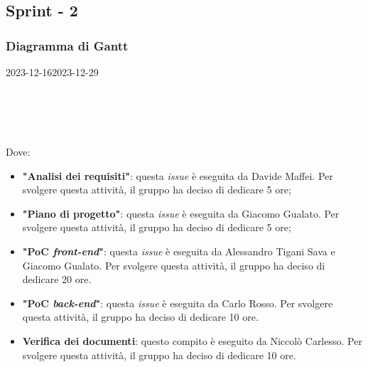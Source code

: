 \subsection{Sprint - 2}

\subsubsection{Diagramma di Gantt}

\begin{ganttchart}[
		x unit=0.6cm, %
		y unit chart=0.6cm,
		bar/.style={fill=blue!50},
		bar height=0.5,
		time slot format=isodate,
		time slot unit=day,
		vgrid,
		today=2023-12-16,
		today rule/.style={draw=red, ultra thick}
	]{2023-12-16}{2023-12-29}
	 \\
	 \\
	 \\
	 \\
	 \\
\end{ganttchart}

Dove:
\begin{itemize}
	\item \textbf{"Analisi dei requisiti"}: questa \textit{issue} è eseguita da
	      Davide Maffei. Per svolgere questa attività, il gruppo ha deciso di
	      dedicare 5 ore;

	\item \textbf{"Piano di progetto"}: questa \textit{issue} è eseguita da
	      Giacomo Gualato. Per svolgere questa attività, il gruppo ha deciso
	      di dedicare 5 ore;

	\item \textbf{"PoC \textit{front-end}"}: questa \textit{issue} è eseguita
	      da Alessandro Tigani Sava e Giacomo Gualato. Per svolgere questa
	      attività, il gruppo ha deciso di dedicare 20 ore.

	\item \textbf{"PoC \textit{back-end}"}: questa \textit{issue} è eseguita
	      da Carlo Rosso. Per svolgere questa attività, il gruppo ha deciso di
	      dedicare 10 ore.

	\item \textbf{Verifica dei documenti}: questo compito è eseguito da
	      Niccolò Carlesso. Per svolgere questa attività, il gruppo ha deciso
	      di dedicare 10 ore.
\end{itemize}

